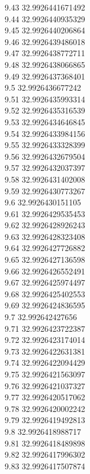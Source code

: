 {9.43	32.9926441671492\\
9.44	32.9926440935329\\
9.45	32.9926440206864\\
9.46	32.9926439486018\\
9.47	32.9926438772711\\
9.48	32.9926438066865\\
9.49	32.9926437368401\\
9.5	32.9926436677242\\
9.51	32.9926435993314\\
9.52	32.9926435316539\\
9.53	32.9926434646845\\
9.54	32.9926433984156\\
9.55	32.9926433328399\\
9.56	32.9926432679504\\
9.57	32.9926432037397\\
9.58	32.9926431402008\\
9.59	32.9926430773267\\
9.6	32.9926430151105\\
9.61	32.9926429535453\\
9.62	32.9926428926243\\
9.63	32.9926428323408\\
9.64	32.9926427726882\\
9.65	32.9926427136598\\
9.66	32.9926426552491\\
9.67	32.9926425974497\\
9.68	32.9926425402553\\
9.69	32.9926424836595\\
9.7	32.992642427656\\
9.71	32.9926423722387\\
9.72	32.9926423174014\\
9.73	32.9926422631381\\
9.74	32.9926422094429\\
9.75	32.9926421563097\\
9.76	32.9926421037327\\
9.77	32.9926420517062\\
9.78	32.9926420002242\\
9.79	32.9926419492813\\
9.8	32.9926418988717\\
9.81	32.9926418489898\\
9.82	32.9926417996302\\
9.83	32.9926417507874\\
}
